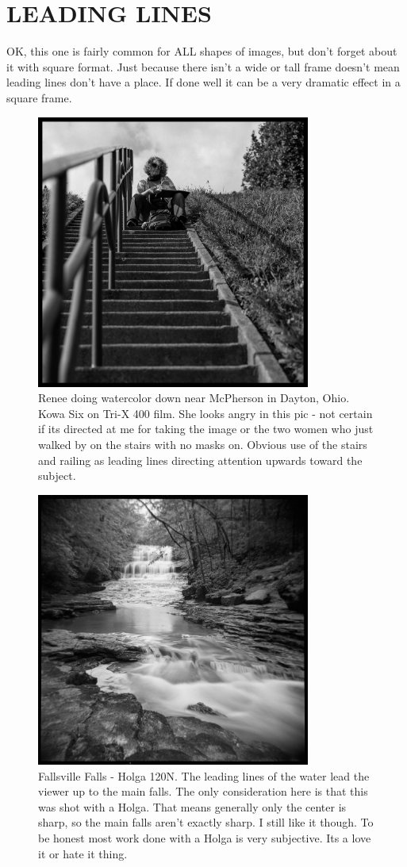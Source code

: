 \documentclass[a4paper]{article}
\begin{document}
\section*{LEADING LINES}
OK, this one is fairly common for ALL shapes of images, but don’t forget about it with square format. Just because there isn’t a wide or tall frame doesn’t mean leading lines don’t have a place. If done well it can be a very dramatic effect in a square frame.  

\begin{figure}[ht!]
    \centering
    \includegraphics[width=90mm]{img/50234103591_81c88c5aec_k.jpeg}
    \caption{Renee doing watercolor down near McPherson in Dayton, Ohio. Kowa Six on Tri-X 400 film. She looks angry in this pic - not certain if its directed at me for taking the image or the two women who just walked by on the stairs with no masks on. Obvious use of the stairs and railing as leading lines directing attention upwards toward the subject.}
\end{figure}

\begin{figure}[ht!]
    \centering
    \includegraphics[width=90mm]{img/49929821132_d892aef245_k.jpeg}
    \caption{Fallsville Falls - Holga 120N. The leading lines of the water lead the viewer up to the main falls. The only consideration here is that this was shot with a Holga. That means generally only the center is sharp, so the main falls aren’t exactly sharp. I still like it though. To be honest most work done with a Holga is very subjective. Its a love it or hate it thing.}
\end{figure}
\end{document}
